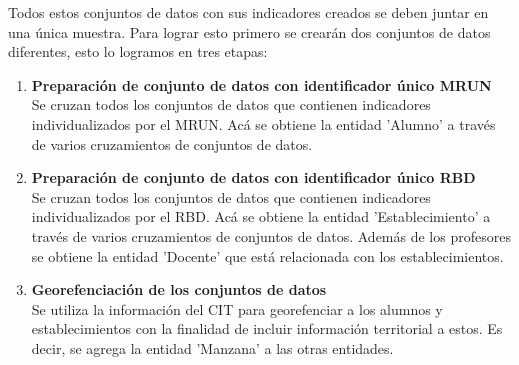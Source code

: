 Todos estos conjuntos de datos con sus indicadores creados se deben juntar en una única muestra. Para lograr esto primero se crearán dos conjuntos de datos diferentes, esto lo logramos en tres etapas:\\
\begin{enumerate}[label=\Roman*]
\item \textbf{Preparación de conjunto de datos con identificador único MRUN} \hfill \\
Se cruzan todos los conjuntos de datos que contienen indicadores individualizados por el MRUN. Acá se obtiene la entidad 'Alumno' a través de varios cruzamientos de conjuntos de datos.
\item \textbf{Preparación de conjunto de datos con identificador único RBD} \hfill \\
Se cruzan todos los conjuntos de datos que contienen indicadores individualizados por el RBD. Acá se obtiene la entidad 'Establecimiento' a través de varios cruzamientos de conjuntos de datos. Además de los profesores se obtiene la entidad 'Docente' que está relacionada con los establecimientos.
\item \textbf{Georefenciación de los conjuntos de datos} \hfill \\
Se utiliza la información del CIT para georefenciar a los alumnos y establecimientos con la finalidad de incluir información territorial a estos. Es decir, se agrega la entidad 'Manzana' a las otras entidades.
\end{enumerate}

